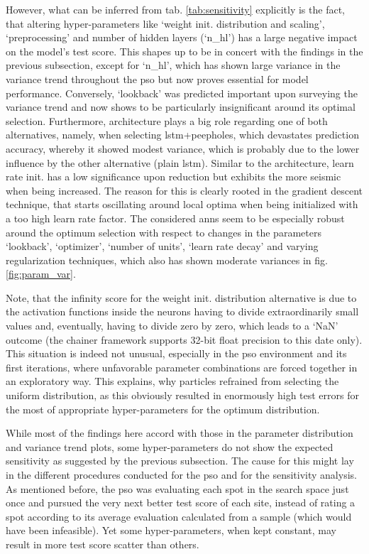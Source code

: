 However, what can be inferred from tab. \ref{tab:sensitivity} explicitly is the fact, that altering hyper-parameters like `weight init. distribution and scaling', `preprocessing' and number of hidden layers (`n\_hl') has a large negative impact on the model's test score.
This shapes up to be in concert with the findings in the previous subsection, except for `n\_hl', which has shown large variance in the variance trend throughout the \gls{pso} but now proves essential for model performance.
Conversely, `lookback' was predicted important upon surveying the variance trend and now shows to be particularly insignificant around its optimal selection.
Furthermore, architecture plays a big role regarding one of both alternatives, namely, when selecting \gls{lstm}+peepholes, which devastates prediction accuracy, whereby it showed modest variance, which is probably due to the lower influence by the other alternative (plain \gls{lstm}).
Similar to the architecture, learn rate init. has a low significance upon reduction but exhibits the more seismic when being increased.
The reason for this is clearly rooted in the gradient descent technique, that starts oscillating around local optima when being initialized with a too high learn rate factor.
The considered \glspl{ann} seem to be especially robust around the optimum selection with respect to changes in the parameters `lookback', `optimizer', `number of units', `learn rate decay' and varying regularization techniques, which also has shown moderate variances in fig. \ref{fig:param_var}.

Note, that the infinity score for the weight init. distribution alternative is due to the activation functions inside the neurons having to divide extraordinarily small values and, eventually, having to divide zero by zero, which leads to a `NaN' outcome (the chainer framework supports 32-bit float precision to this date only).
This situation is indeed not unusual, especially in the \gls{pso} environment and its first iterations, where unfavorable parameter combinations are forced together in an exploratory way.
This explains, why particles refrained from selecting the uniform distribution, as this obviously resulted in enormously high test errors for the most of appropriate hyper-parameters for the optimum distribution.  

While most of the findings here accord with those in the parameter distribution and variance trend plots, some hyper-parameters do not show the expected sensitivity as suggested by the previous subsection.
The cause for this might lay in the different procedures conducted for the \gls{pso} and for the sensitivity analysis.
As mentioned before, the \gls{pso} was evaluating each spot in the search space just once and pursued the very next better test score of each site, instead of rating a spot according to its average evaluation calculated from a sample (which would have been infeasible).
Yet some hyper-parameters, when kept constant, may result in more test score scatter than others.

